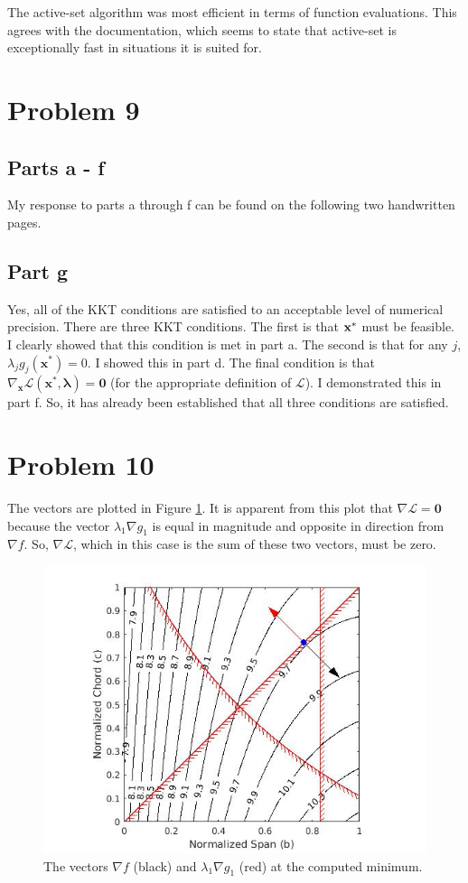 \documentclass[twoside]{report} %
\begin{document}
The active-set algorithm was most efficient in terms of function evaluations. This agrees with the documentation,
which seems to state that active-set is exceptionally fast in situations it is suited for.

\section{Problem 9}
\subsection{Parts a - f}
My response to parts a through f can be found on the following two handwritten pages.
\cleardoublepage
\subsection{Part g}
Yes, all of the KKT conditions are satisfied to an acceptable level of numerical precision. There are three KKT conditions.
The first is that $\bf x^*$ must be feasible. I clearly showed that this condition is met in part a. The second is that
for any $j$, $\lambda_j g_j(\mathbf{x^*}) = 0$. I showed this in part d. The final condition is that
$\nabla_{\mathbf{x}}\mathcal{L}(\mathbf{x^*,\lambda}) = \mathbf{0}$ (for the appropriate definition of $\mathcal{L}$). I
demonstrated this in part f. So, it has already been established that all three conditions are satisfied.

\section{Problem 10}
The vectors are plotted in Figure \ref{equal_and_opposite}. It is apparent from this plot that $\nabla \mathcal{L} = \mathbf{0}$
because the vector $\lambda_1 \nabla g_1$ is equal in magnitude and opposite in direction from $\nabla f$. So,
$\nabla \mathcal{L}$, which in this case is the sum of these two vectors, must be zero.

\begin{figure}
\includegraphics[width = \linewidth]{equal_and_opposite.jpg}
\centering
\caption{The vectors $\nabla f$ (black) and $\lambda_1 \nabla g_1$ (red) at the computed minimum.}
\label{equal_and_opposite}
\end{figure}
\end{document}
